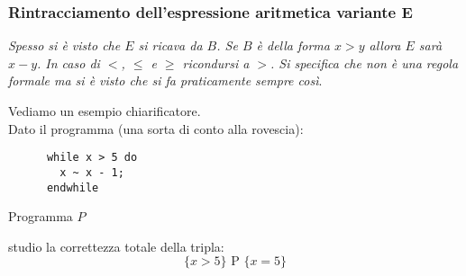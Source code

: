 				        	\subsubsection{Rintracciamento dell'espressione aritmetica variante E}
				      				\textit{Spesso si è visto che $E$ si ricava da $B$. Se $B$ è della forma $x>y$ 
				      					allora $E$ sarà $x-y$. In caso di $<$, $\leq$ e $\geq$ ricondursi a $>$. Si 
				      					specifica che non è una regola formale ma si è visto che si fa praticamente 
				      					sempre così}.\\
				      				\begin{esempio}
				      					Vediamo un esempio chiarificatore.\\
				      					Dato il programma (una sorta di conto alla rovescia):
				      					\begin{listing}[H]
				      						\begin{lstlisting}
      while x > 5 do
        x ~ x - 1;
      endwhile  
				      						\end{lstlisting}
				      						\caption{Programma $P$}
				      						\label{E:t}
				      					\end{listing}
				      					studio la correttezza totale della tripla:
				      					\[\{x>5\}\mbox{ P }\{x=5\}\]

\end{esempio}
